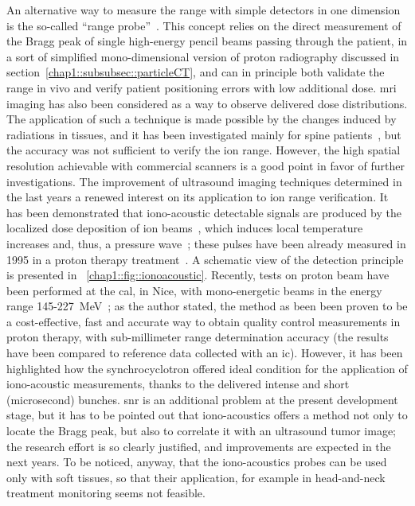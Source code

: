 An alternative way to measure the range with simple detectors in one dimension is the so-called \enquote{range probe}~\parencite{Mumot2010, Watts2009}. This concept relies on the direct measurement of the Bragg peak of single high-energy pencil beams passing through the patient, in a sort of simplified mono-dimensional version of proton radiography discussed in section~\ref{chap1::subsubsec::particleCT}, and can in principle both validate the range in vivo and verify patient positioning errors with low additional dose.        
\gls{mri} imaging has also been considered as a way to observe delivered dose distributions. The application of such a technique is made possible by the changes induced by radiations in tissues, and it has been investigated mainly for spine patients~\parencite{Gensheimer2010}, but the accuracy was not sufficient to verify the ion range. However, the high spatial resolution achievable with commercial scanners is a good point in favor of further investigations. 
The improvement of ultrasound imaging techniques  determined in the last years a renewed interest on its application to ion range verification. It has been demonstrated that iono-acoustic detectable signals are produced by the localized dose deposition of ion beams~\parencite{Tada1991}, which induces local temperature increases and, thus, a pressure wave~\parencite{Parodi2015b}; these pulses have been already measured in 1995 in a proton therapy treatment~\parencite{Hayakawa1995}.  A schematic view of the detection principle is presented in \figurename~\ref{chap1::fig::ionoacoustic}. Recently, tests on proton beam have been performed at the \gls{cal}, in Nice, with mono-energetic beams in the energy range 145-227~MeV~\parencite{Lehrack2017}; as the author stated, the method as been been proven to be a cost-effective, fast and accurate way to obtain quality control measurements in proton therapy, with sub-millimeter range determination accuracy (the results have been compared to reference data collected with an \gls{ic}). However, it has been highlighted how the synchrocyclotron offered ideal condition for the application of iono-acoustic measurements, thanks to the delivered intense and short (microsecond) bunches. \gls{snr} is an additional problem at the present development stage, but it has to be pointed out that iono-acoustics offers a method not only to locate the Bragg peak, but also to correlate it with an ultrasound tumor image; the research effort is so clearly justified, and improvements are expected in the next years. To be noticed, anyway, that the iono-acoustics probes can be used only with soft tissues, so that their application, for example in head-and-neck treatment monitoring seems not feasible.
